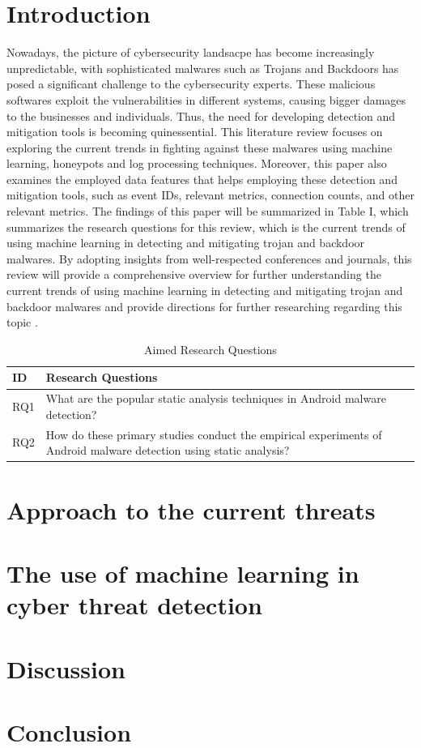\documentclass{IEEEtran}[conference]
\begin{document}
\section{Introduction}
Nowadays, the picture of cybersecurity landsacpe has become increasingly unpredictable, with sophisticated malwares such as Trojans and Backdoors has posed a significant challenge to the cybersecurity experts. These malicious softwares exploit the vulnerabilities in different systems, causing bigger damages to the businesses and individuals. Thus, the need for developing detection and mitigation tools is becoming quinessential. This literature review focuses on exploring the current trends in fighting against these malwares using machine learning, honeypots and log processing techniques. Moreover, this paper also examines the employed data features that helps employing these detection and mitigation tools, such as event IDs, relevant metrics, connection counts, and other relevant metrics. The findings of this paper will be summarized in Table I, which summarizes the research questions for this review, which is the current trends of using machine learning in detecting and mitigating trojan and backdoor malwares. By adopting insights from well-respected conferences and journals, this review will provide a comprehensive overview for further understanding the current trends of using machine learning in detecting and mitigating trojan and backdoor malwares and provide directions for further researching regarding this topic \cite{Sayadi2020}.

\begin{table}[H] %
    \centering
    \scriptsize %
    \caption{Aimed Research Questions} %
    \begin{tabular}{|p{1cm}|p{5.5cm}|} %
    \hline
    \textbf{ID} & \textbf{Research Questions} \\ \hline
    RQ1 & What are the popular static analysis techniques in Android malware detection? \\ \hline
    RQ2 & How do these primary studies conduct the empirical experiments of Android malware detection using static analysis?\\ \hline
    \end{tabular}%
    \label{table1}
\end{table}

\section{Approach to the current threats}

\section{The use of machine learning in cyber threat detection}
\section{Discussion}
\section{Conclusion}

\printbibliography
\end{document}
